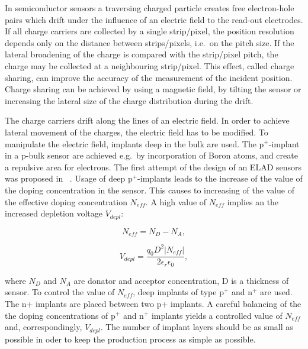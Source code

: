 
In semiconductor sensors a traversing charged particle creates free electron-hole pairs which drift under the influence of an electric field to the read-out electrodes. 
If all charge carriers are collected by a single strip/pixel, the position resolution depends only on the distance between strips/pixels, i.e.\ on the pitch size. 
If the lateral broadening of the charge is compared with the strip/pixel pitch, the charge may be collected at a neighbouring strip/pixel. 
This effect, called charge sharing, can improve the accuracy of the measurement of the incident position. 
Charge sharing can be achieved by using a magnetic field, by tilting the sensor or increasing the lateral size of the charge distribution during the drift.

The charge carriers drift along the lines of an electric field. 
In order to achieve lateral movement of the charges, the electric field has to be modified. 
To manipulate the electric field, implants deep in the bulk are used. 
The p$^+$-implant  in a p-bulk sensor are achieved e.g.\ by incorporation of Boron atoms, and  create a repulsive area for electrons. 
The first attempt of the design of an ELAD sensors was proposed in ~\cite{JANSEN2016242}. 
Usage of deep p$^+$-implants leads to the increase of the value of the doping concentration in the sensor. 
This causes to increasing of the value of the effective doping concentration $N_{eff}$. 
A high value of $N_{eff}$ implies an the increased depletion voltage $V_{depl}$: 

\begin{equation}
 N_{eff}=N_{D}-N_{A} ,
\end{equation}

\begin{equation}
 V_{depl}=\frac{q_0 D^2 |N_{eff}|}{2 \epsilon_r \epsilon_0 } ,
\end{equation}

\noindent where $N_{D}$ and $N_{A}$ are donator and acceptor concentration, D is a thickness of sensor.
To control the value of $N_{eff}$, deep implants of type p$^+$ and n$^+$ are used. 
The n+ implants are placed between two p+ implants. 
A careful balancing of the the doping concentrations of p$^+$ and n$^+$ implants yields a controlled value of $N_{eff}$ and, correspondingly, $V_{depl}$. 
The number of implant layers should be as small as possible in oder to keep the production process as simple as possible. 

